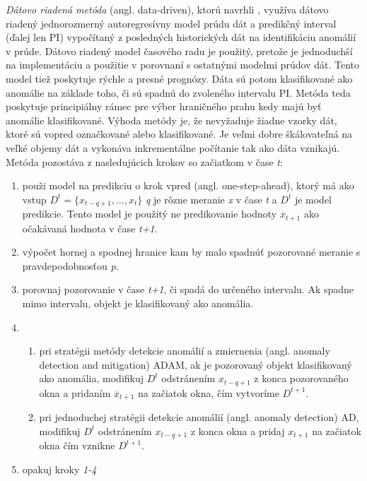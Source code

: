 \textit{Dátovo riadená metóda} (angl. data-driven), ktorú navrhli \citep{hill2010anomaly}, využíva dátovo riadený jednorozmerný autoregresívny model prúdu dát a predikčný interval (ďalej len PI) vypočítaný z posledných historických dát na identifikáciu anomálií v prúde. Dátovo riadený model časového radu je použitý, pretože je jednoduchší na implementáciu a použitie v porovnaní s ostatnými modelmi prúdov dát. Tento model tiež poskytuje rýchle a presné prognózy. Dáta sú potom klasifikované ako anomálie na základe toho, či sú spadnú do zvoleného intervalu PI. Metóda teda poskytuje principiálny rámec pre výber hraničného prahu kedy majú byť anomálie klasifikované. Výhoda metódy je, že nevyžaduje žiadne vzorky dát, ktoré sú vopred označkované alebo klasifikované. Je veľmi dobre škálovateľná na veľké objemy dát a vykonáva inkrementálne počítanie tak ako dáta vznikajú.
Metóda pozostáva z nasledujúcich krokov so začiatkom v čase \textit{t}:
\begin{enumerate}
	\item použi model na predikciu o krok vpred (angl. one-step-ahead), ktorý má ako vstup $\displaystyle D^t = \{x_{t-q+1}, ..., x_t\}$ \textit{q} je rôzne meranie \textit{x} v čase \textit{t} a $\displaystyle D^t$ je model predikcie. Tento model je použitý ne predikovanie hodnoty $\displaystyle \overline{x}_{t+1}$ ako očakávaná hodnota v čase \textit{t+1}.
	\item výpočet hornej a spodnej hranice kam by malo spadnúť pozorované meranie s pravdepodobnosťou \textit{p}.
	\item porovnaj pozorovanie v čase \textit{t+1}, či spadá do určeného intervalu. Ak spadne mimo intervalu, objekt je klasifikovaný ako anomália.
	\item 
		\begin{enumerate}
			\item pri stratégii metódy detekcie anomálií a zmiernenia (angl. anomaly detection and mitigation) ADAM, ak je pozorovaný objekt klasifikovaný ako anomália, modifikuj $\displaystyle D^t$ odstránením $\displaystyle x_{t-q+1}$ z konca pozorovaného okna a pridaním $\displaystyle \overline{x}_{t+1}$ na začiatok okna, čím vytvoríme $\displaystyle D^{t+1}$.
			\item pri jednoduchej stratégii detekcie anomálií (angl. anomaly detection) AD, modifikuj $\displaystyle D^t$  odstránením $\displaystyle x_{t-q+1}$ z konca okna a pridaj $\displaystyle x_{t+1}$ na začiatok okna čím vznikne $\displaystyle D^{t+1}$.
		\end{enumerate}
	\item opakuj kroky \textit{1-4}
\end{enumerate}
